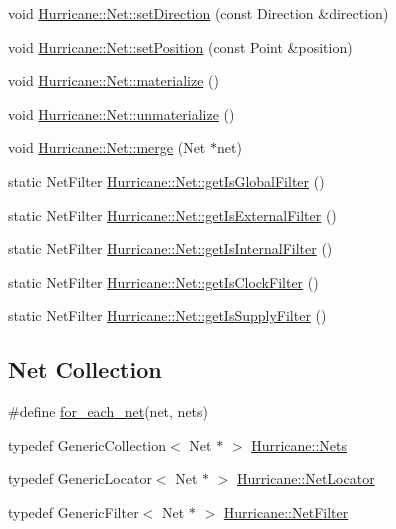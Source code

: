 \begin{DoxyCompactItemize}
\item 
void \hyperlink{group__NetClass_gac33d13bb0ddc60f369d5bfcffc4bb0f8}{Hurricane\-::\-Net\-::set\-Direction} (const Direction \&direction)
\item 
void \hyperlink{group__NetClass_ga0a3a3232a74ebced14b14029c5199561}{Hurricane\-::\-Net\-::set\-Position} (const Point \&position)
\item 
void \hyperlink{group__NetClass_gae46f7e4a9b00b265c06cb6e0ee00b806}{Hurricane\-::\-Net\-::materialize} ()
\item 
void \hyperlink{group__NetClass_ga9e53a3d54b61f7081263e6d7b4fa81b9}{Hurricane\-::\-Net\-::unmaterialize} ()
\item 
void \hyperlink{group__NetClass_ga442f62d23364805f39816cd543284886}{Hurricane\-::\-Net\-::merge} (Net $\ast$net)
\item 
static Net\-Filter \hyperlink{group__NetClass_ga1730ed1247cd9bce7fcf519ea60dc738}{Hurricane\-::\-Net\-::get\-Is\-Global\-Filter} ()
\item 
static Net\-Filter \hyperlink{group__NetClass_ga3af91a80e219e37e70229e61dfd385da}{Hurricane\-::\-Net\-::get\-Is\-External\-Filter} ()
\item 
static Net\-Filter \hyperlink{group__NetClass_ga7a2d1c4ab84bf81a16e24557d2342ea5}{Hurricane\-::\-Net\-::get\-Is\-Internal\-Filter} ()
\item 
static Net\-Filter \hyperlink{group__NetClass_gafdb2269f3a88923c25264f6f785372a1}{Hurricane\-::\-Net\-::get\-Is\-Clock\-Filter} ()
\item 
static Net\-Filter \hyperlink{group__NetClass_gac241f44abf1f332004dd6103ee1dfa48}{Hurricane\-::\-Net\-::get\-Is\-Supply\-Filter} ()
\end{DoxyCompactItemize}
\subsection*{Net Collection}
\begin{DoxyCompactItemize}
\item 
\#define \hyperlink{group__NetClass_ga7b33248b2cd5c4ba373cd09f232301ce}{for\-\_\-each\-\_\-net}(net, nets)
\item 
typedef Generic\-Collection$<$ Net $\ast$ $>$ \hyperlink{group__NetClass_ga3404a8b17130a1824f4a281704b04df7}{Hurricane\-::\-Nets}
\item 
typedef Generic\-Locator$<$ Net $\ast$ $>$ \hyperlink{group__NetClass_ga2911512d442f8332c3cd3a135332cc02}{Hurricane\-::\-Net\-Locator}
\item 
typedef Generic\-Filter$<$ Net $\ast$ $>$ \hyperlink{group__NetClass_ga0dfd2c5b40325a919d139091312732e9}{Hurricane\-::\-Net\-Filter}
\end{DoxyCompactItemize}


